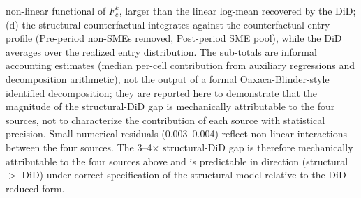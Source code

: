 \begin{table}[htbp]
\begin{threeparttable}
\begin{tablenotes}
non-linear functional of $F_c^k$, larger than the linear log-mean recovered
by the DiD; (d) the structural counterfactual integrates against the
counterfactual entry profile (Pre-period non-SMEs removed, Post-period SME
pool), while the DiD averages over the realized entry distribution. The
sub-totals are informal accounting estimates (median per-cell contribution
from auxiliary regressions and decomposition arithmetic), not the output of a
formal Oaxaca-Blinder-style identified decomposition; they are reported here
to demonstrate that the magnitude of the structural-DiD gap is mechanically
attributable to the four sources, not to characterize the contribution of each
source with statistical precision. Small numerical residuals (0.003--0.004)
reflect non-linear interactions between the four sources. The 3--4$\times$
structural-DiD gap is therefore mechanically attributable to the four
sources above and is predictable in direction (structural $>$ DiD) under
correct specification of the structural model relative to the DiD reduced form.
\end{tablenotes}
\end{threeparttable}
\end{table}
